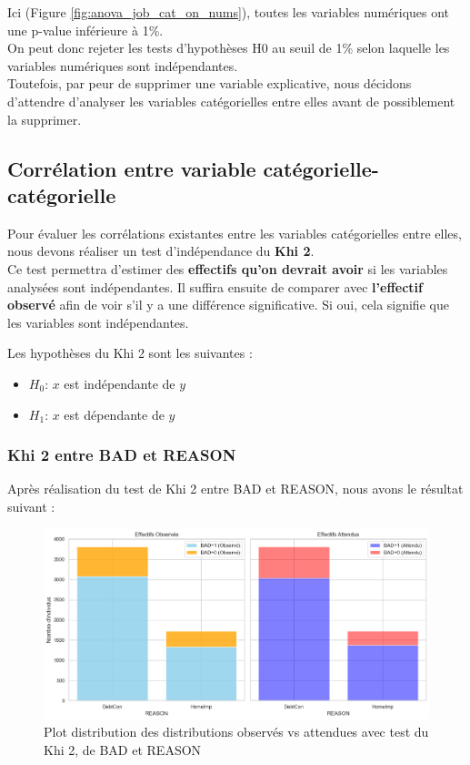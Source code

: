 \documentclass[a4paper,12pt]{report}
\begin{document}
Ici (Figure \ref{fig:anova_job_cat_on_nums}), toutes les variables numériques ont une p-value inférieure à 1\%.\\
On peut donc rejeter les tests d'hypothèses H0 au seuil de 1\% selon laquelle les variables numériques sont indépendantes.\\
Toutefois, par peur de supprimer une variable explicative, nous décidons d'attendre d'analyser les variables catégorielles entre elles avant de possiblement la supprimer.

\subsection{Corrélation entre variable catégorielle-catégorielle}

Pour évaluer les corrélations existantes entre les variables catégorielles entre elles,
nous devons réaliser un test d'indépendance du \textbf{Khi 2}.\\
Ce test permettra d'estimer des \textbf{effectifs qu'on devrait avoir} si les variables analysées sont indépendantes.
Il suffira ensuite de comparer avec \textbf{l'effectif observé} afin de voir s'il y a une différence significative.
Si oui, cela signifie que les variables sont indépendantes.

\bigbreak

Les hypothèses du Khi 2 sont les suivantes :
\begin{itemize}
  \item $H_0$: $x$ est indépendante de $y$
  \item $H_1$: $x$ est dépendante de $y$
\end{itemize}

\bigbreak

\subsubsection{Khi 2 entre {\color{teal} BAD} et {\color{teal} REASON}}

Après réalisation du test de Khi 2 entre {\color{teal} BAD} et {\color{teal} REASON}, nous avons le résultat suivant :\\

\begin{figure}[h!]
  \includegraphics[width=\textwidth]{../images/plot_khi2_bad_vs_reason}
  \caption{Plot distribution des distributions observés vs attendues avec test du Khi 2, de BAD et REASON}
  \label{fig:plot_khi2_bad_vs_reason}
\end{figure}
\end{document}
